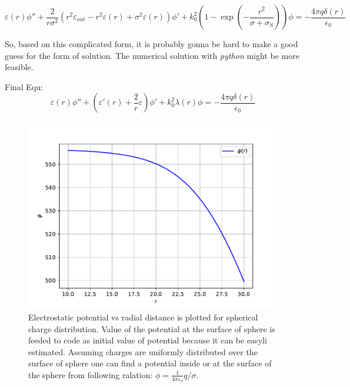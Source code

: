 \documentclass{article}
\begin{document}
\begin{equation}
    \label{eq:PB3}
    \varepsilon(r) \phi'' + \frac{2}{r \sigma^2}(r^2 \varepsilon_{out} - r^2 \varepsilon(r) +
    \sigma^2 \varepsilon(r)) \phi' + k_0^2 \left(  1 - \exp \left(- \frac{r^2 }{\sigma + \sigma_S} \right)  \right) \phi = 
    -\frac{4\pi q \delta(r)}{\epsilon_0}
\end{equation}

So, based on this complicated form, it is probably gonna be hard to make a good guess for 
the form of solution. The numerical solution with \textit{python}  might be more feasible.

Final Equ:
\begin{equation}
    \label{eq:PB4}
    \varepsilon(r) \phi'' + (\varepsilon'(r) + \frac{2}{r} \varepsilon) \phi'
    + k_0^2 \lambda(r) \phi = -\frac{4\pi q \delta(r)}{\epsilon_0}
\end{equation}

%
\begin{figure}
  \begin{centering}
    \includegraphics[width=12.0cm]{Figure2.pdf}
    \caption{Electrostatic potential vs radial distance is plotted for spherical charge distribution.
      Value of the potential at the surface of sphere is feeded to code as initial value of potential
      because it can be easyli estimated. Assuming charges are uniformly distributed over the surface of sphere
      one can find a potential inside or at the surface of the sphere from following ralation:
      $\phi = \frac{1}{4 \pi \varepsilon_0} q/\sigma$. }
    \label{fig:phi_r}
  \end{centering}
\end{figure}
%
\end{document}
